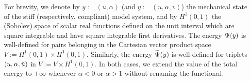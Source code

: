 
For brevity, we denote by $y:=(u, \alpha)$ (and $y:=(u, \alpha, v)$) the mechanical state of the stiff (respectively, compliant) model system, and by $H^1(0, 1)$ the (Sobolev) space of scalar real functions defined on the unit interval which are square integrable and have square integrable first derivatives. The energy $\Psi(y)$ is well-defined for pairs belonging in the Cartesian vector product space $V:=H^1(0,1)\times  H^1(0,1)$. Similarly, the energy $\widetilde\Psi(y)$ is well-defined for triplets $(u, \alpha, \tilde u)$ in $\widetilde V:=V\times  H^1(0,1)$. In both cases, we extend the value of the total energy to $+\infty$ whenever $\alpha < 0$ or $\alpha > 1$ without renaming the functional.









